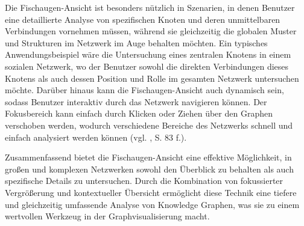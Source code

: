 Die Fischaugen-Ansicht ist besonders nützlich in Szenarien, in denen Benutzer eine detaillierte Analyse von spezifischen Knoten und deren unmittelbaren Verbindungen vornehmen müssen, während sie gleichzeitig die globalen Muster und Strukturen im Netzwerk im Auge behalten möchten. Ein typisches Anwendungsbeispiel wäre die Untersuchung eines zentralen Knotens in einem sozialen Netzwerk, wo der Benutzer sowohl die direkten Verbindungen dieses Knotens als auch dessen Position und Rolle im gesamten Netzwerk untersuchen möchte. Darüber hinaus kann die Fischaugen-Ansicht auch dynamisch sein, sodass Benutzer interaktiv durch das Netzwerk navigieren können. Der Fokusbereich kann einfach durch Klicken oder Ziehen über den Graphen verschoben werden, wodurch verschiedene Bereiche des Netzwerks schnell und einfach analysiert werden können (vgl. \cite{fisheye:Sarkar}, S. 83 f.).

Zusammenfassend bietet die Fischaugen-Ansicht eine effektive Möglichkeit, in großen und komplexen Netzwerken sowohl den Überblick zu behalten als auch spezifische Details zu untersuchen. Durch die Kombination von fokussierter Vergrößerung und kontextueller Übersicht ermöglicht diese Technik eine tiefere und gleichzeitig umfassende Analyse von Knowledge Graphen, was sie zu einem wertvollen Werkzeug in der Graphvisualisierung macht.